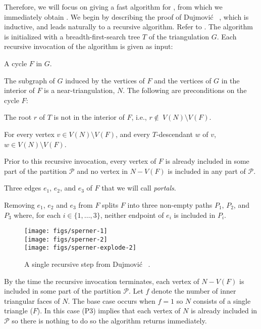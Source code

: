 \documentclass[kpfonts]{patmorin}
\begin{document}
Therefore, we will focus on giving a fast algorithm for , from which we immediately obtain .  We begin by describing the proof of Dujmović \etal\  \cite{dujmovic.joret.ea:planar}, which is inductive, and leads naturally to a recursive algorithm.  Refer to . The algorithm is initialized with a breadth-first-search tree $T$ of the triangulation $G$.  Each recursive invocation of the algorithm is given as input:
\begin{compactenum}
  \item A cycle $F$ in $G$.

  The subgraph of $G$ induced by the vertices of $F$ and the vertices of $G$ in the interior of $F$ is a near-triangulation, $N$.  The following are preconditions on the cycle $F$:
  \begin{compactenum}[(P1)]
    \item The root $r$ of $T$ is not in the interior of $F$, i.e., $r\not\in\ V(N)\setminus V(F)$.
    \item For every vertex $v\in V(N)\setminus V(F)$, and every $T$-descendant $w$ of $v$, $w\in V(N)\setminus V(F)$.
    \item Prior to this recursive invocation, every vertex of $F$ is already included in some part of the partition $\mathcal{P}$ and no vertex in $N-V(F)$ is included in any part of $\mathcal{P}$.
  \end{compactenum}
  \item Three edges $e_1$, $e_2$, and $e_3$ of $F$ that we will call \emph{portals}.

  Removing $e_1$, $e_2$ and $e_3$ from $F$ splits $F$ into three non-empty paths $P_1$, $P_2$, and $P_3$ where, for each $i\in\{1,\ldots,3\}$, neither endpoint of $e_i$ is included in $P_i$.
\end{compactenum}

\begin{figure}
  \begin{center}
    \texttt{[image: figs/sperner-1]} \\[1ex]
    \texttt{[image: figs/sperner-2]} \\[1ex]
    \texttt{[image: figs/sperner-explode-2]}
  \end{center}
  \caption{A single recursive step from Dujmović \etal\  \cite{dujmovic.joret.ea:planar}.}
\end{figure}

By the time the recursive invocation terminates, each vertex of $N-V(F)$ is included in some part of the partition $\mathcal{P}$. Let $f$ denote the number of inner triangular faces of $N$.  The base case occurs when $f=1$ so $N$ consists of a single triangle ($F$).  In this case (P3) implies that each vertex of $N$ is already included in $\mathcal{P}$ so there is nothing to do so the algorithm returns immediately.
\end{document}
